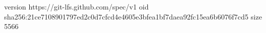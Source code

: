 version https://git-lfs.github.com/spec/v1
oid sha256:21ce7108901797ed2c0d7cfcd4e4605e3bfea1bf7daea92fc15ea6b6076f7cd5
size 5566
